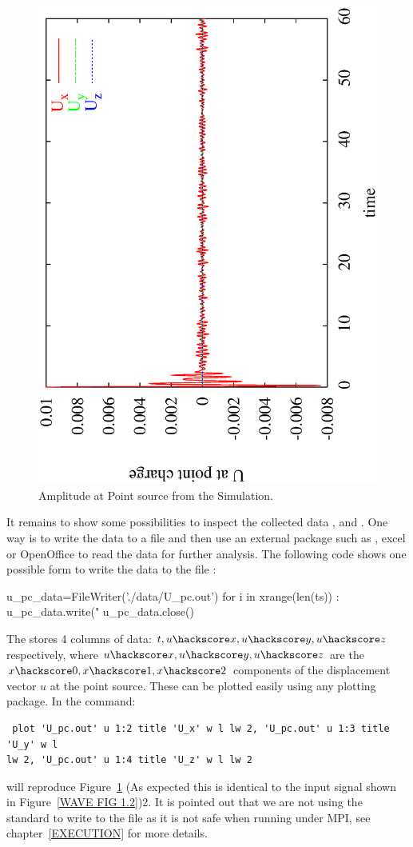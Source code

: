 \begin{figure}[t!]
\centerline{\includegraphics[width=4.in, angle=-90]{WavePC}}
\caption{Amplitude at Point source from the Simulation.}
\label{WAVE FIG 1}
\end{figure}

It remains to show some possibilities to inspect the collected data ,  and .
One way is to write the data to a file and then use an external package such as \gnuplot, excel or OpenOffice to read the data for further analysis. The following code shows one possible form to write the data to the 
file :
\begin{python}
u_pc_data=FileWriter('./data/U_pc.out')
for i in xrange(len(ts)) :
    u_pc_data.write("%
u_pc_data.close()
\end{python}
The  stores 4 columns of data: $t,u\hackscore x,u\hackscore y,u\hackscore z$ 
respectively, where $u\hackscore x,u\hackscore y,u\hackscore z$ are the $x\hackscore 0,x\hackscore 1,x\hackscore 2$ components of the displacement vector $u$ at the point source. These can be
plotted easily using any plotting package. In \gnuplot the command:
\begin{verbatim}
 plot 'U_pc.out' u 1:2 title 'U_x' w l lw 2, 'U_pc.out' u 1:3 title 'U_y' w l 
lw 2, 'U_pc.out' u 1:4 title 'U_z' w l lw 2
\end{verbatim}
will reproduce Figure~\ref{WAVE FIG 1} (As expected this is identical to the input signal shown in Figure~\ref{WAVE FIG 1.2})2. It is pointed out that we are not using the
standard \PYTHON {} to write to the file  as it is not safe
when running \escript under MPI, see chapter~\ref{EXECUTION} for more details.

